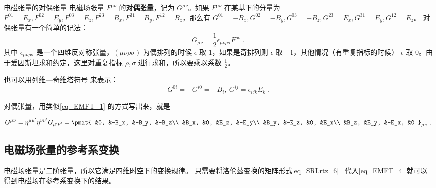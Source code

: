 \begin{definition}{电磁张量的对偶张量}
电磁场张量 $F^{\mu\nu}$ 的\textbf{对偶张量}，记为 $G^{\mu\nu}$。如果 $F^{\mu\nu}$ 在某基下的分量为 $F^{01}=E_x, F^{02}=E_y, F^{03}=E_z, F^{23}=B_x, F^{31}=B_y, F^{12}=B_z$，那么有 $G^{01}=-B_x, G^{02}=-B_y, G^{03}=-B_z, G^{23}=E_x, G^{31}=E_y, G^{12}=E_z$。
对偶张量有一个简单的记法：
\begin{equation}
G_{\mu\nu}=\frac{1}{2}\epsilon_{\mu\nu\rho\sigma}F^{\rho\sigma}~.
\end{equation}
其中 $\epsilon_{\mu\nu\rho\sigma}$ 是一个四维反对称张量，$(\mu\nu\rho\sigma)$ 为偶排列的时候 $\epsilon$ 取 $1$，如果是奇排列则 $\epsilon$ 取 $-1$，其他情况（有重复指标的时候） $\epsilon$ 取 $0$。由于爱因斯坦求和约定，这里对重复指标 $\rho,\sigma$ 进行求和，所以要乘以系数 $\frac{1}{2}$。

也可以用列维—奇维塔符号 来表示：
\begin{equation}
G^{0i}=-G^{i0}=-B_i,\ G^{ij}=\epsilon_{ijk}E_k~.
\end{equation}
\end{definition}

对偶张量，用类似\autoref{eq_EMFT_1} 的方式写出来，就是

\begin{equation}
\begin{aligned}
G^{\mu\nu}=\eta^{\mu\mu'}\eta^{\nu\nu'}G_{\mu'\nu'}=
\pmat{
&0, &-B_x, &-B_y, &-B_z\\ 
&B_x, &0, &E_z, &-E_y\\ 
&B_y, &-E_z, &0, &E_x\\
&B_z, &E_y, &-E_x, &0
}_{\mu\nu}~.
\end{aligned}
\end{equation}

\subsection{电磁场张量的参考系变换}
电磁场张量是二阶张量，所以它满足四维时空下的变换规律。
只需要将洛伦兹变换的矩阵形式\autoref{eq_SRLrtz_6}~ 代入\autoref{eq_EMFT_4} 就可以得到电磁场在参考系变换下的结果。

